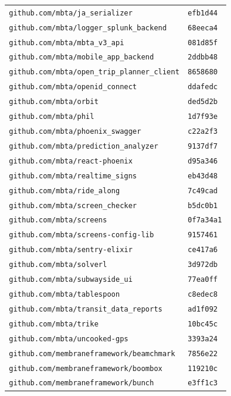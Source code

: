 \begin{longtable}{@{}p{} l@{}}
\texttt{github.com/mbta/ja\_serializer} & \texttt{efb1d44} \\
\texttt{github.com/mbta/logger\_splunk\_backend} & \texttt{68eeca4} \\
\texttt{github.com/mbta/mbta\_v3\_api} & \texttt{081d85f} \\
\texttt{github.com/mbta/mobile\_app\_backend} & \texttt{2ddbb48} \\
\texttt{github.com/mbta/open\_trip\_planner\_client} & \texttt{8658680} \\
\texttt{github.com/mbta/openid\_connect} & \texttt{ddafedc} \\
\texttt{github.com/mbta/orbit} & \texttt{ded5d2b} \\
\texttt{github.com/mbta/phil} & \texttt{1d7f93e} \\
\texttt{github.com/mbta/phoenix\_swagger} & \texttt{c22a2f3} \\
\texttt{github.com/mbta/prediction\_analyzer} & \texttt{9137df7} \\
\texttt{github.com/mbta/react-phoenix} & \texttt{d95a346} \\
\texttt{github.com/mbta/realtime\_signs} & \texttt{eb43d48} \\
\texttt{github.com/mbta/ride\_along} & \texttt{7c49cad} \\
\texttt{github.com/mbta/screen\_checker} & \texttt{b5dc0b1} \\
\texttt{github.com/mbta/screens} & \texttt{0f7a34a1} \\
\texttt{github.com/mbta/screens-config-lib} & \texttt{9157461} \\
\texttt{github.com/mbta/sentry-elixir} & \texttt{ce417a6} \\
\texttt{github.com/mbta/solverl} & \texttt{3d972db} \\
\texttt{github.com/mbta/subwayside\_ui} & \texttt{77ea0ff} \\
\texttt{github.com/mbta/tablespoon} & \texttt{c8edec8} \\
\texttt{github.com/mbta/transit\_data\_reports} & \texttt{ad1f092} \\
\texttt{github.com/mbta/trike} & \texttt{10bc45c} \\
\texttt{github.com/mbta/uncooked-gps} & \texttt{3393a24} \\
\texttt{github.com/membraneframework/beamchmark} & \texttt{7856e22} \\
\texttt{github.com/membraneframework/boombox} & \texttt{119210c} \\
\texttt{github.com/membraneframework/bunch} & \texttt{e3ff1c3} \\

\end{longtable}
